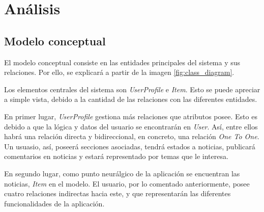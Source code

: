
\chapter{Análisis}\label{analisis}
\section{Modelo conceptual}\label{sec:modelo_conceptual}

El modelo conceptual consiste en las entidades principales del sistema y sus relaciones. Por ello, se explicará a partir de la imagen \ref{fig:class_diagram}.


Los elementos centrales del sistema son \textit{UserProfile} e \textit{Item}. Esto se puede apreciar a simple vista, debido a la cantidad de las relaciones con las diferentes entidades.

En primer lugar, \textit{UserProfile} gestiona más relaciones que atributos posee. Esto es debido a que la lógica y datos del usuario se encontrarán en \textit{User}. Así, entre ellos habrá una relación directa y bidireccional, en concreto, una relación \textit{One To One}. Un usuasio, así, poseerá secciones asociadas, tendrá estados a noticias, publicará comentarios en noticias y estará representado por temas que le interesa.

En segundo lugar, como punto neurálgico de la aplicación se encuentran las noticias, \textit{Item} en el modelo. El usuario, por lo comentado anteriormente, posee cuatro relaciones indirectas hacia este, y que representarán las diferentes funcionalidades de la aplicación.

